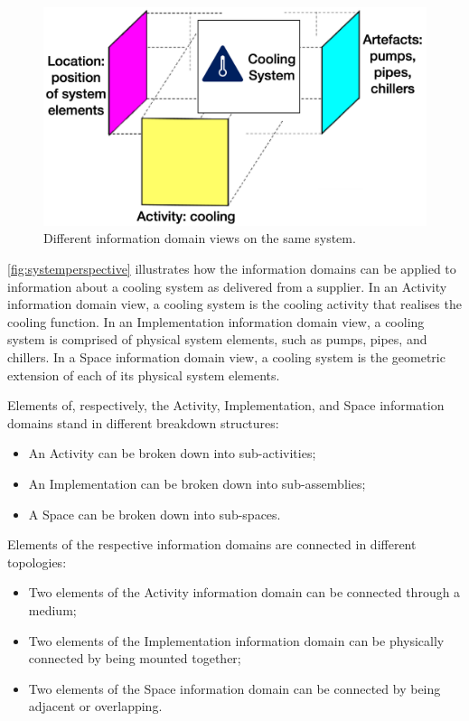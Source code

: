\documentclass[../main.tex]{subfiles}
\begin{document}
\begin{figure}[htb]
  \centering
  \includegraphics[width=.6\textwidth]{img/IMFmanual-img004.png}
  \caption{Different information domain views on the same system.}
  \label{fig:systemperspective}
\end{figure}



\autoref{fig:systemperspective} illustrates how the information domains can be applied to information about a cooling system as delivered from a supplier. 
In an  Activity information domain view, a cooling system is the cooling activity that realises the cooling function. 
In an  Implementation information domain view, a cooling system is comprised of physical system elements, such as pumps, pipes, and  chillers.
In a Space information domain view, a cooling system is the geometric extension of each of its physical system elements.


Elements of, respectively, the Activity, Implementation, and Space information domains stand in different breakdown structures:
\begin{itemize}
    \item An Activity can be broken down into sub-activities;
    \item An Implementation can be broken down into sub-assemblies;
    \item A Space can be broken down into sub-spaces. 
\end{itemize}
Elements of the respective information domains are connected in different topologies: 
\begin{itemize}
    \item Two elements of the Activity information domain can be connected through a medium;
    \item Two elements of the Implementation information domain can be physically connected by being mounted together; 
    \item Two elements of the Space information domain can be connected by being adjacent or overlapping. 
\end{itemize}
\end{document}
